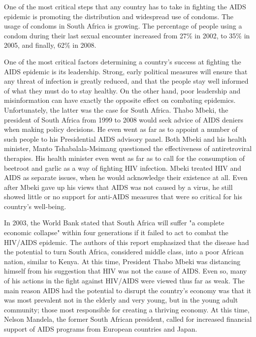 \documentclass[12pt]{report}
\begin{document}
One of the most critical steps that any country has to take in fighting the AIDS epidemic is promoting the distribution and widespread use of condoms.
The usage of condoms in South Africa is growing.  The percentage of people using a condom during their last sexual encounter increased from 27\% in 2002, to 35\% in 2005, and finally, 62\% in 2008\cite{shisana}.

One of the most critical factors determining a country's success at fighting the AIDS epidemic is its leadership.  
Strong, early political measures will ensure that any threat of infection is greatly reduced, and that the people stay well informed of what they must do to stay healthy.
On the other hand, poor leadership and misinformation can have exactly the opposite effect on combating epidemics.
Unfortunately, the latter was the case for South Africa.
Thabo Mbeki, the president of South Africa from 1999 to 2008 would seek advice of AIDS deniers when making policy decisions.  
He even went as far as to appoint a number of such people to his Presidential AIDS advisory panel.  
Both Mbeki and his health minister, Manto Tshabalala-Msimang questioned the effectiveness of antiretroviral therapies.
His health minister even went as far as to call for the consumption of beetroot and garlic as a way of fighting HIV infection.
Mbeki treated HIV and AIDS as separate issues, when he would acknowledge their existence at all.
Even after Mbeki gave up his views that AIDS was not caused by a virus, he still showed little or no support for anti-AIDS measures that were so critical for his country's well-being.

In 2003, the World Bank stated that South Africa will suffer "a complete economic collapse" within four generations if it failed to act to combat the HIV/AIDS epidemic.  
The authors of this report emphasized that the disease had the potential to turn South Africa, considered middle class, into a poor African nation, similar to Kenya.
At this time, President Thabo Mbeki was distancing himself from his suggestion that HIV was not the cause of AIDS.  
Even so, many of his actions in the fight against HIV/AIDS were viewed thus far as weak.
The main reason AIDS had the potential to disrupt the country's economy was that it was most prevalent not in the elderly and very young, but in the young adult community; those most responsible for creating a thriving economy.
At this time, Nelson Mandela, the former South African president, called for increased financial support of AIDS programs from European countries and Japan.
\end{document}
